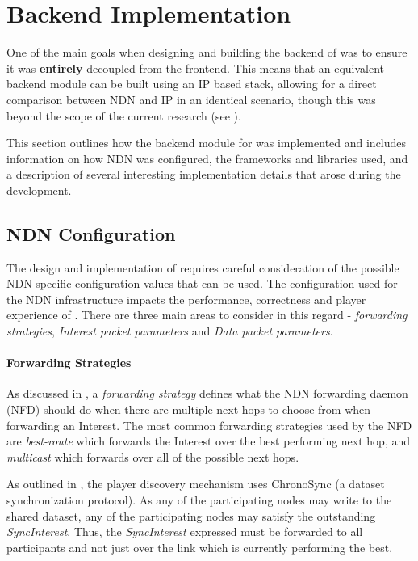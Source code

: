 \chapter{Backend Implementation}
One of the main goals when designing and building the backend of \game{} was to ensure it was \textbf{entirely} decoupled from the frontend. This means that an equivalent backend module can be built using an IP based stack, allowing for a direct comparison between NDN and IP in an identical scenario, though this was beyond the scope of the current research (see ).

This section outlines how the backend module for \game{} was implemented and includes information on how NDN was configured, the frameworks and libraries used, and a description of several interesting implementation details that arose during the development.

\section{NDN Configuration}
The design and implementation of \game{} requires careful consideration of the possible NDN specific configuration values that can be used. The configuration used for the NDN infrastructure impacts the performance, correctness and player experience of \game{}. There are three main areas to consider in this regard - \textit{forwarding strategies}, \textit{Interest packet parameters} and \textit{Data packet parameters}.

\subsubsection{Forwarding Strategies}
As discussed in , a \textit{forwarding strategy} defines what the NDN forwarding daemon (NFD) should do when there are multiple next hops to choose from when forwarding an Interest. The most common forwarding strategies used by the NFD are \textit{best-route} which forwards the Interest over the best performing next hop, and \textit{multicast} which forwards over all of the possible next hops. 

As outlined in , the player discovery mechanism uses ChronoSync (a dataset synchronization protocol). As any of the participating nodes may write to the shared dataset, any of the participating nodes may satisfy the outstanding \textit{SyncInterest}. Thus, the \textit{SyncInterest} expressed must be forwarded to all participants and not just over the link which is currently performing the best.


